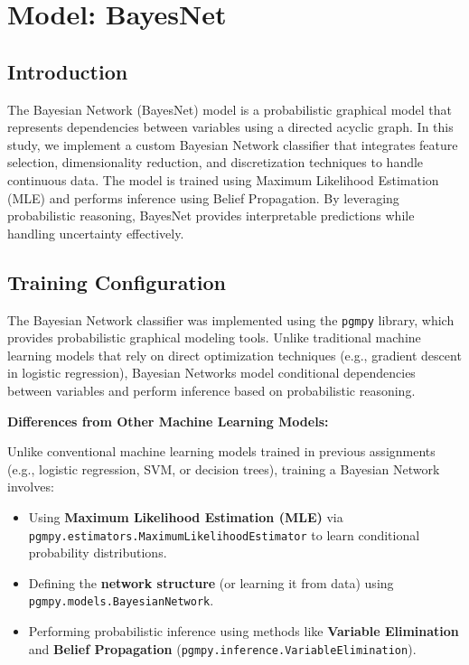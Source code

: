 \section{Model: BayesNet}

\subsection{Introduction}

The Bayesian Network (BayesNet) model is a probabilistic graphical model that represents dependencies between variables using a directed acyclic graph. In this study, we implement a custom Bayesian Network classifier that integrates feature selection, dimensionality reduction, and discretization techniques to handle continuous data. The model is trained using Maximum Likelihood Estimation (MLE) and performs inference using Belief Propagation. By leveraging probabilistic reasoning, BayesNet provides interpretable predictions while handling uncertainty effectively.

\subsection{Training Configuration}

The Bayesian Network classifier was implemented using the \texttt{pgmpy} library, which provides probabilistic graphical modeling tools. Unlike traditional machine learning models that rely on direct optimization techniques (e.g., gradient descent in logistic regression), Bayesian Networks model conditional dependencies between variables and perform inference based on probabilistic reasoning.

\textbf{Differences from Other Machine Learning Models:}  

Unlike conventional machine learning models trained in previous assignments (e.g., logistic regression, SVM, or decision trees), training a Bayesian Network involves:  

\begin{itemize}
    \item Using \textbf{Maximum Likelihood Estimation (MLE)} via \\
    \texttt{pgmpy.estimators.MaximumLikelihoodEstimator} to learn conditional probability distributions.
    \item Defining the \textbf{network structure} (or learning it from data) using \\
    \texttt{pgmpy.models.BayesianNetwork}.
    \item Performing probabilistic inference using methods like \textbf{Variable Elimination} and \textbf{Belief Propagation} (\texttt{pgmpy.inference.VariableElimination}).
\end{itemize}

